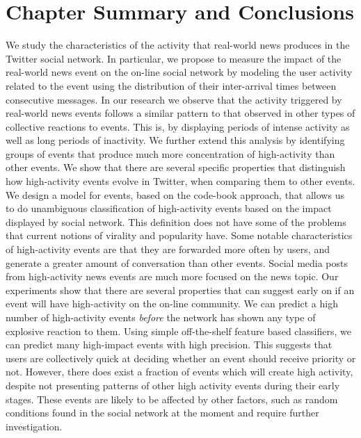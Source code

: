 \section{Chapter Summary and Conclusions}

We study the characteristics of the activity that real-world news produces in
the Twitter social network. 
%
In particular, we propose to measure the impact of the real-world news event on
the on-line social network by modeling the user activity related to the event
using the distribution of their inter-arrival times between consecutive messages.
%
In our research we observe that the activity triggered by real-world news events
follows a similar pattern to that observed in other types of collective
reactions to events. 
%
This is, by displaying periods of intense activity as well as long periods of
inactivity.
%
We further extend this analysis by identifying groups of events that produce
much more concentration of high-activity than other events. 
%
We show that there are several specific properties that distinguish how
high-activity events evolve in Twitter, when comparing them to other events. 
%
We design a model for events, based on the code-book approach, that allows us to
do unambiguous classification of high-activity events based on the impact
displayed by social network. 
%
This definition does not have some of the problems that current notions of
virality and popularity have. 
%
Some notable characteristics of high-activity events are that they are forwarded
more often by users, and generate a greater amount of conversation than other
events.
%
Social media posts from high-activity news events are much more focused on the
news topic. 
%
Our experiments show that there are several properties that can suggest early on
if an event will have high-activity on the on-line community. 
%
We can predict a high number of high-activity events {\em before} the network
has shown any type of explosive reaction to them. 
%
Using simple off-the-shelf feature based classifiers, we can predict many
high-impact events with high precision. 
%
This suggests that users are collectively quick at deciding whether an event
should receive priority or not. 
%
However, there does exist a fraction of events which will create high activity,
despite not presenting patterns of other high activity events during their early
stages.
%
These events are likely to be affected by other factors, such as random
conditions found in the social network at the moment and require further
investigation.
